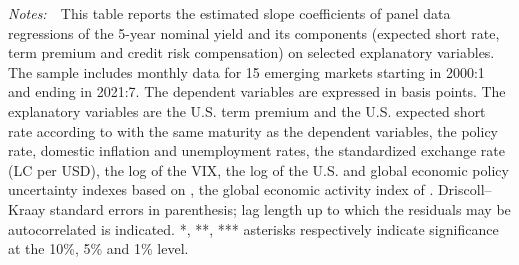 \documentclass[a4paper, 12pt]{article}
\newcommand{\tabnote}[1]{
	\begin{tablenotes}[para,flushleft]
		\footnotesize \emph{Notes:~}~#1
	\end{tablenotes}
}
\begin{document}
\begin{appendices}
\begin{normalsize}
\begin{table}[!h]
\begin{center}
\begin{threeparttable}
					\tabnote{This table reports the estimated slope coefficients of panel data regressions of the 5-year nominal yield and its components (expected short rate, term premium and credit risk compensation) on selected explanatory variables. The sample includes monthly data for 15 emerging markets starting in 2000:1 and ending in 2021:7. The dependent variables are expressed in basis points. The explanatory variables are the U.S. term premium and the U.S. expected short rate according to \cite{KimWright:2005} with the same maturity as the dependent variables, the policy rate, domestic inflation and unemployment rates, the standardized exchange rate (LC per USD), the log of the VIX, the log of the U.S. and global economic policy uncertainty indexes based on \cite{BakerBloomDavis:2016}, the global economic activity index of \cite{Hamilton:2021}. Driscoll--Kraay standard errors in parenthesis; lag length up to which the residuals may be autocorrelated is indicated. *, **, *** asterisks respectively indicate significance at the 10\%, 5\% and 1\% level.}
				\end{threeparttable}
			\end{center}
		\end{table}
	\end{normalsize}
	

\end{appendices}
\end{document}
